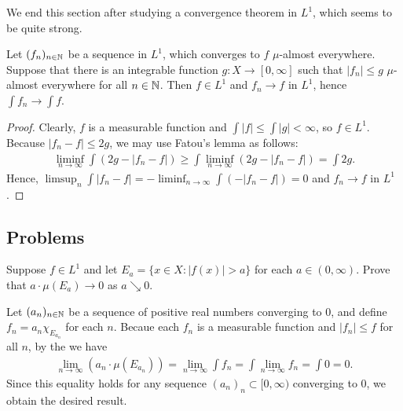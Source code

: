 We end this section after studying a convergence theorem in $L^1$, which seems to be quite strong.
\begin{thm}
    Let $(f_n)_{n\in{\mathbb{N}}}$ be a sequence in $L^1$, which converges to $f$ $\mu$-almost everywhere.
    Suppose that there is an integrable function $g: X\rightarrow[0, \infty]$ such that $|f_n|\leq g$ $\mu$-almost everywhere for all $n\in{\mathbb{N}}$.
    Then $f\in L^1$ and $f_n\rightarrow f$ in $L^1$, hence $\int f_n\rightarrow\int f$.
\end{thm}
\begin{proof}
    Clearly, $f$ is a measurable function and $\int|f|\leq\int|g|<\infty$, so $f\in L^1$.
    Because $|f_n-f|\leq 2g$, we may use Fatou's lemma as follows:
    \begin{align*}
        \liminf_{n\rightarrow\infty}\int(2g-|f_n-f|)\geq\int\liminf_{n\rightarrow\infty}(2g-|f_n-f|)=\int 2g.
    \end{align*}
    Hence, $\limsup_n\int|f_n-f|=-\liminf_{n\rightarrow\infty}\int(-|f_n-f|)=0$ and $f_n\rightarrow f$ in $L^1$.
\end{proof}

\subsection*{Problems}

\begin{prob}[2nd textbook, 1.5.8]
    Suppose $f\in L^1$ and let $E_a=\{x\in X:|f(x)|>a\}$ for each $a\in(0, \infty)$.
    Prove that $a\cdot\mu(E_a)\rightarrow 0$ as $a\searrow 0$.
\end{prob}
\begin{sol}
    Let $(a_n)_{n\in{\mathbb{N}}}$ be a sequence of positive real numbers converging to 0, and define $f_n=a_n\chi_{E_{a_n}}$ for each $n$.
    Becaue each $f_n$ is a measurable function and $|f_n|\leq f$ for all $n$, by the \ldct we have
    \begin{align*}
        \lim_{n\rightarrow\infty}(a_n\cdot\mu(E_{a_n}))=\lim_{n\rightarrow\infty}\int f_n=\int\lim_{n\rightarrow\infty}f_n=\int 0=0.
    \end{align*}
    Since this equality holds for any sequence $(a_n)_n\subset[0, \infty)$ converging to 0, we obtain the desired result.
\end{sol}

